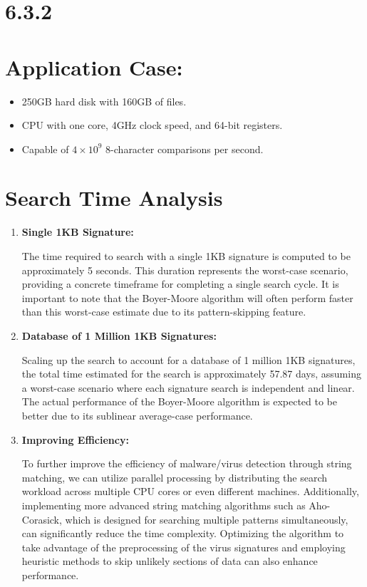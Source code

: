 \documentclass{article}
\begin{document}
\section*{6.3.2}

\section*{Application Case:}
\begin{itemize}
    \item 250GB hard disk with 160GB of files.
    \item CPU with one core, 4GHz clock speed, and 64-bit registers.
    \item Capable of \(4 \times 10^9\) 8-character comparisons per second.
\end{itemize}

\section*{Search Time Analysis}

\begin{enumerate}
    \item \textbf{Single 1KB Signature:}
    
    The time required to search with a single 1KB signature is computed to be approximately 5 seconds. This duration represents the worst-case scenario, providing a concrete timeframe for completing a single search cycle. It is important to note that the Boyer-Moore algorithm will often perform faster than this worst-case estimate due to its pattern-skipping feature.
    
    \item \textbf{Database of 1 Million 1KB Signatures:}
    
    Scaling up the search to account for a database of 1 million 1KB signatures, the total time estimated for the search is approximately 57.87 days, assuming a worst-case scenario where each signature search is independent and linear. The actual performance of the Boyer-Moore algorithm is expected to be better due to its sublinear average-case performance.
    
    \item \textbf{Improving Efficiency:}
    
    To further improve the efficiency of malware/virus detection through string matching, we can utilize parallel processing by distributing the search workload across multiple CPU cores or even different machines. Additionally, implementing more advanced string matching algorithms such as Aho-Corasick, which is designed for searching multiple patterns simultaneously, can significantly reduce the time complexity. Optimizing the algorithm to take advantage of the preprocessing of the virus signatures and employing heuristic methods to skip unlikely sections of data can also enhance performance.  
    
\end{enumerate}
\end{document}
